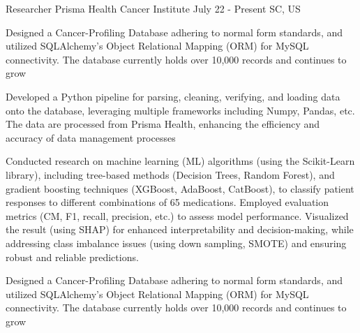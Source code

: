 
\vspace*{-0.2cm}

\begin{cventries}
    \cventry
        {Researcher} %
        {Prisma Health Cancer Institute} %
        {July 22 - Present}
        {SC, US} %
        {
            \begin{cvitemsfree} %
                \item{Designed a Cancer-Profiling Database adhering to normal form standards, and utilized SQLAlchemy's Object Relational Mapping (ORM) for MySQL connectivity. The database currently holds over 10,000 records and continues to grow}
                \item{Developed a Python pipeline for parsing, cleaning, verifying, and loading data onto the database, leveraging multiple frameworks including Numpy, Pandas, etc. The data are processed from Prisma Health, enhancing the efficiency and accuracy of data management processes}
                \item{Conducted research on machine learning (ML) algorithms (using the Scikit-Learn library), including tree-based methods (Decision Trees, Random Forest), and gradient boosting techniques (XGBoost, AdaBoost, CatBoost), to classify patient responses to different combinations of 65 medications. Employed evaluation metrics (CM, F1, recall, precision, etc.) to assess model performance. Visualized the result (using SHAP) for enhanced interpretability and decision-making, while addressing class imbalance issues (using down sampling, SMOTE) and ensuring robust and reliable predictions.}
                \item{Designed a Cancer-Profiling Database adhering to normal form standards, and utilized SQLAlchemy's Object Relational Mapping (ORM) for MySQL connectivity. The database currently holds over 10,000 records and continues to grow}

\end{cvitemsfree}}
\end{cventries}
